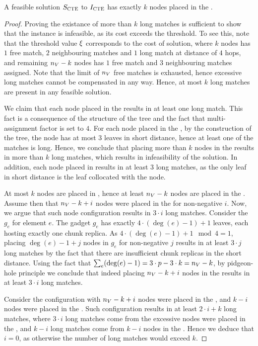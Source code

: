 \begin{lemma}
  A feasible solution $S_{\mathrm{\textsc{CTE}}}$ to $I_{\mathrm{\textsc{CTE}}}$ has exactly $k$ nodes placed in the \MatchSubtree.
  \label{lem:n-matchsubtree-ma}
\end{lemma}

\begin{proof}
  
Proving the existance of more than $k$ long matches is sufficient to show that the instance is infeasible, as its cost exceeds the threshold.
To see this, note that the threshold value $\xi$ corresponds to the cost of solution, where $k$ nodes has $1$ free match, $2$ neighbouring matches and $1$ long match at distance of $4$ hops, and remaining $n_V-k$ nodes has $1$ free match and $3$ neighbouring matches assigned.
Note that the limit of $n_V$ free matches is exhausted, hence excessive long matches cannot be compensated in any way.
Hence, at most $k$ long matches are present in any feasible solution.


 We claim that each node placed in the \MatchSubtree{} results in at least one long match.
This fact is a consequence of the structure of the tree and the fact that multi-assignment factor is set to $4$.
For each node placed in the \MatchSubtree{}, by the construction of the tree, the node has at most $3$ leaves in short distance, hence at least one of the matches is long.
Hence, we conclude that placing more than $k$ nodes in the \MatchSubtree{} results in more than $k$ long matches, which results in infeasibility of the solution.
In addition, each node placed in \UnqGadget{} results in at least $3$ long matches, as the only leaf in short distance is the leaf collocated with the node.

At most $k$ nodes are placed in \MatchSubtree{}, hence at least $n_V-k$ nodes are placed in the \CoverSubtree.
Assume then that $n_V-k+i$ nodes were placed in the \CoverSubtree{} for non-negative $i$.
Now, we argue that such node configuration results in $3\cdot i$ long matches.
Consider the \ElGadget{} $g_e$ for element $e$.
The gadget $g_e$ has exactly $4\cdot(\deg(e)-1)+1$ leaves, each hosting exactly one chunk replica.
As $4\cdot(\deg(e)-1)+1 \mod 4 = 1$, placing $\deg(e)-1+j$ nodes in $g_e$ for non-negative $j$ results in at least $3\cdot j$ long matches by the fact that there are insufficient chunk replicas in the short distance.
Using the fact that $\sum_e(\deg(e)-1) = 3\cdot p - 3\cdot k = n_V - k$, by pidgeon-hole principle we conclude that indeed placing $n_V-k+i$ nodes in the \CoverSubtree{} results in at least $3\cdot i$ long matches.

Consider the configuration with $n_V-k+i$ nodes were placed in the \CoverSubtree{}, and $k-i$ nodes were placed in the \MatchSubtree{}.
Such configuration results in at least $2\cdot i + k$ long matches, where $3\cdot i$ long matches come from the excessive nodes were placed in the \CoverSubtree{}, and $k-i$ long matches come from $k-i$ nodes in the \MatchSubtree{}.
Hence we deduce that $i = 0$, as otherwise the number of long matches would exceed $k$.

\end{proof}

